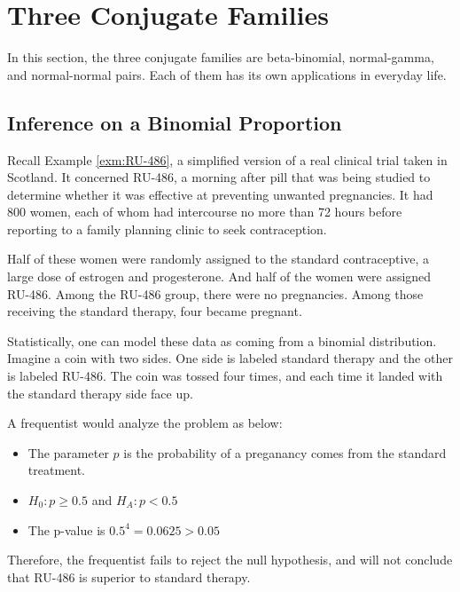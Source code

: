 \documentclass[]{book}
\theoremstyle{definition}
\theoremstyle{definition}
\theoremstyle{definition}
\theoremstyle{remark}
\let\BeginKnitrBlock\begin \let\EndKnitrBlock\end
\begin{document}
\section{Three Conjugate Families}\label{three-conjugate-families}

In this section, the three conjugate families are beta-binomial,
normal-gamma, and normal-normal pairs. Each of them has its own
applications in everyday life.

\subsection{Inference on a Binomial
Proportion}\label{inference-on-a-binomial-proportion}

\BeginKnitrBlock{example}
\protect\hypertarget{exm:RU-486more}{}{\label{exm:RU-486more} }Recall
Example \ref{exm:RU-486}, a simplified version of a real clinical trial
taken in Scotland. It concerned RU-486, a morning after pill that was
being studied to determine whether it was effective at preventing
unwanted pregnancies. It had 800 women, each of whom had intercourse no
more than 72 hours before reporting to a family planning clinic to seek
contraception.

Half of these women were randomly assigned to the standard
contraceptive, a large dose of estrogen and progesterone. And half of
the women were assigned RU-486. Among the RU-486 group, there were no
pregnancies. Among those receiving the standard therapy, four became
pregnant.
\EndKnitrBlock{example}

Statistically, one can model these data as coming from a binomial
distribution. Imagine a coin with two sides. One side is labeled
standard therapy and the other is labeled RU-486. The coin was tossed
four times, and each time it landed with the standard therapy side face
up.

A frequentist would analyze the problem as below:

\begin{itemize}
\item
  The parameter \(p\) is the probability of a preganancy comes from the
  standard treatment.
\item
  \(H_0: p \geq 0.5\) and \(H_A: p < 0.5\)
\item
  The p-value is \(0.5^4 = 0.0625 > 0.05\)
\end{itemize}

Therefore, the frequentist fails to reject the null hypothesis, and will
not conclude that RU-486 is superior to standard therapy.
\end{document}
